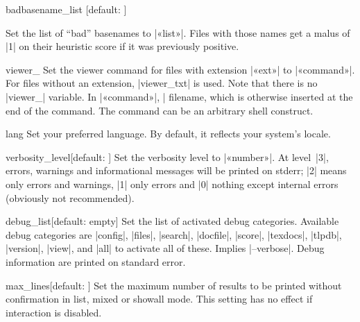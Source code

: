 \documentclass{texdoc-doc}
\begin{document}
\begin{confitem}{badbasename\_list}
  {}[default: ]

Set the list of ``bad'' basenames to |«list»|. Files with those names get a
malus of |1| on their heuristic score if it was previously positive.
\end{confitem}

\begin{confitem}{viewer\_}{}
Set the viewer command for files with extension |«ext»| to |«command»|. For
files without an extension, |viewer_txt| is used. Note that there is no
|viewer_| variable. In |«command»|, |%
filename, which is otherwise inserted at the end of the command. The command
can be an arbitrary shell construct.
\end{confitem}

\begin{confitem}{lang}{}
Set your preferred language. By default, it reflects your system's locale.
\end{confitem}

\begin{confitem}{verbosity\_level}{}[default: ]
Set the verbosity level to |«number»|. At level~|3|, errors, warnings and
informational messages will be printed on stderr; |2| means only errors and
warnings, |1| only errors and |0| nothing except internal errors (obviously not
recommended).
\end{confitem}

\begin{confitem}{debug\_list}{}[default: empty]
Set the list of activated debug categories. Available debug categories are
|config|, |files|, |search|, |docfile|, |score|, |texdocs|, |tlpdb|, |version|,
|view|, and |all| to activate all of these. Implies |--verbose|. Debug
information are printed on standard error.
\end{confitem}

\begin{confitem}{max\_lines}{}[default: ]
Set the maximum number of results to be printed without confirmation in list,
mixed or showall mode. This setting has no effect if interaction is disabled.
\end{confitem}
\end{document}
